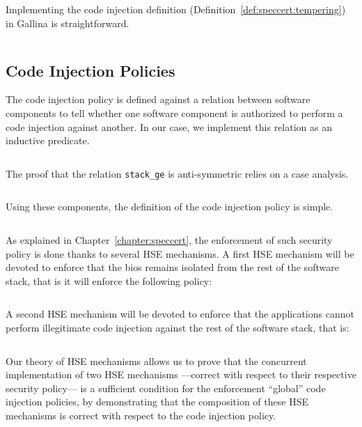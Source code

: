 Implementing the code injection definition
(Definition~\ref{def:speccert:tempering}) in Gallina is straightforward.

\inputminted[gobble=2,firstline=338,lastline=344]{coq}{Listings/SpecCert.v}

\subsection{Code Injection Policies}

The code injection policy is defined against a relation between software
components to tell whether one software component is authorized to perform a
code injection against another.
%
In our case, we implement this relation as an inductive predicate.

\inputminted[gobble=2,firstline=274,lastline=281]{coq}{Listings/SpecCert.v}

The proof that the relation \texttt{stack\_ge} is anti-symmetric relies on a
case analysis.

\inputminted[gobble=2,firstline=586,lastline=592]{coq}{Listings/SpecCert.v}

Using these components, the definition of the code injection policy is simple.

\inputminted[gobble=2,firstline=346,lastline=352]{coq}{Listings/SpecCert.v}

As explained in Chapter~\ref{chapter:speccert}, the enforcement of such security
policy is done thanks to several HSE mechanisms.
%
A first HSE mechanism will be devoted to enforce that the \ac{bios} remains
isolated from the rest of the software stack, that is it will enforce the
following policy:

\inputminted[gobble=2,firstline=539,lastline=545]{coq}{Listings/SpecCert.v}

A second HSE mechanism will be devoted to enforce that the applications cannot
perform illegitimate code injection against the rest of the software stack, that
is:

\inputminted[gobble=2,firstline=547,lastline=554]{coq}{Listings/SpecCert.v}

Our theory of HSE mechanisms allows us to prove that the concurrent
implementation of two HSE mechanisms ---correct with respect to their respective
security policy--- is a sufficient condition for the enforcement ``global'' code
injection policies, by demonstrating that the composition of these HSE
mechanisms is correct with respect to the code injection policy.

\inputminted[gobble=2,firstline=556,lastline=583]{coq}{Listings/SpecCert.v}
